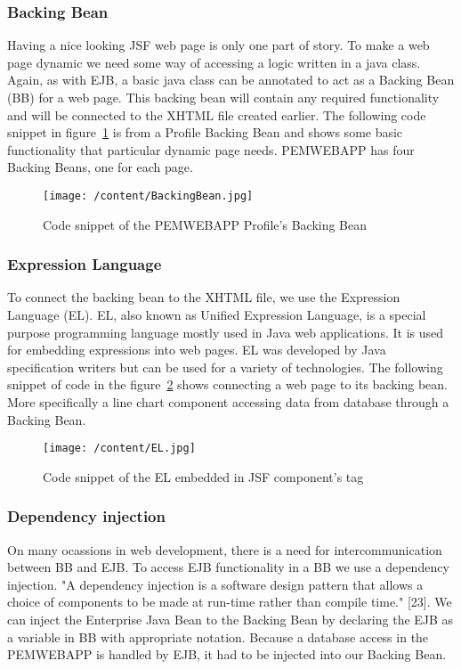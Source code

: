 \documentclass[12pt, a4paper]{report}   %
\begin{document}
\begin{enumerate}
\subsubsection{Backing Bean}
Having a nice looking JSF web page is only one part of story. To make a web page dynamic we need some way of accessing a logic written in a java class. Again, as with EJB, a basic java class can be annotated to act as a Backing Bean (BB) for a web page. This backing bean will contain any required functionality and will be connected to the XHTML file created earlier. The following code snippet in figure~\ref{BackingBean} is from a Profile Backing Bean and shows some basic functionality that particular dynamic page needs. PEMWEBAPP has four Backing Beans, one for each page.


\begin{figure}[H]
  \centering
	\texttt{[image: /content/BackingBean.jpg]}
	  \caption{Code snippet of the PEMWEBAPP Profile's Backing Bean}
	  \label{BackingBean}
\end{figure}


\subsubsection{Expression Language}
To connect the backing bean to the XHTML file, we use the Expression Language (EL). EL, also known as Unified Expression Language, is a special purpose programming language mostly used in Java web applications. It is used for embedding expressions into web pages. EL was developed by Java specification writers but can be used for a variety of technologies. The following snippet of code in the figure~\ref{EL} shows connecting a web page to its backing bean. More specifically a line chart component accessing data from database through a Backing Bean.


\begin{figure}[H]
  \centering
	\texttt{[image: /content/EL.jpg]}
	  \caption{Code snippet of the EL embedded in JSF component's tag}
	  \label{EL}
\end{figure}


\subsubsection{Dependency injection}
On many ocassions in web development, there is a need for intercommunication between BB and EJB. To access EJB functionality in a BB we use a dependency injection. "A dependency injection is a software design pattern that allows a choice of components to be made at run-time rather than compile time." [23]. We can inject the Enterprise Java Bean to the Backing Bean by declaring the EJB as a variable in BB with appropriate notation. Because a database access in the PEMWEBAPP is handled by EJB, it had to be injected into our Backing Bean.



\end{enumerate}
\end{document}
